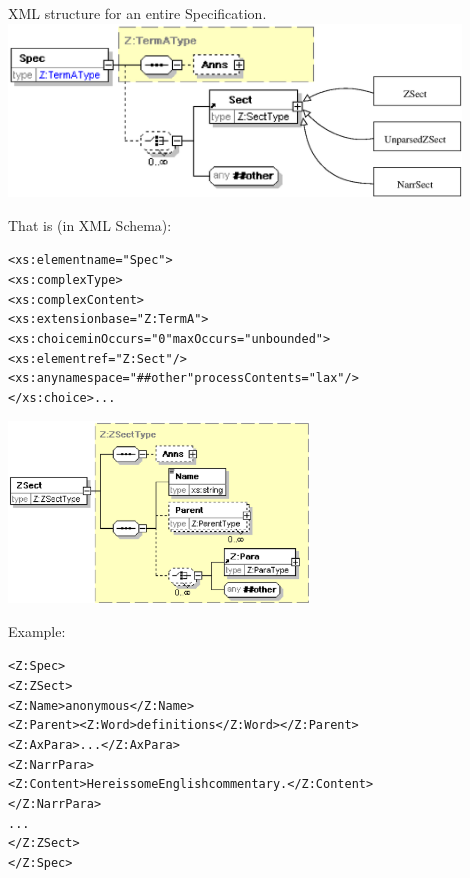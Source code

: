 \documentclass[%
   slidesonly,%
   semhelv,%
   landscape]{seminar}
\begin{document}
\begin{slide}
  XML structure for an entire Specification.
  \includegraphics[width=0.9\textwidth]{specall2.eps}

\vspace{-3ex}
That is (in XML Schema):
\begin{footnotesize}
\begin{alltt}
<xs:element name="Spec">
    <xs:complexType> 
      <xs:complexContent>
        <xs:extension base="Z:TermA">
          <xs:choice minOccurs="0" maxOccurs="unbounded">
            <xs:element ref="Z:Sect"/>
            <xs:any namespace="##other" processContents="lax"/>
          </xs:choice> ...
\end{alltt}
\end{footnotesize}
\end{slide}

\begin{slide}
  \includegraphics[width=0.6\textwidth]{zsect.eps}
\vspace{-6ex}

Example:
\begin{footnotesize}
\begin{alltt}
<Z:Spec>
  <Z:ZSect>
    <Z:Name>anonymous</Z:Name>
    <Z:Parent><Z:Word>definitions</Z:Word></Z:Parent>
    <Z:AxPara>...</Z:AxPara>
    <Z:NarrPara>
      <Z:Content>Here is some English commentary.</Z:Content>
    </Z:NarrPara>
    ...
  </Z:ZSect>
</Z:Spec>
\end{alltt}
\end{footnotesize}
\end{slide}
\end{document}
